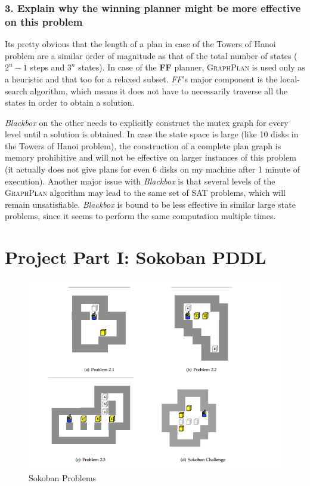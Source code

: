\documentclass[10pt, letter]{article}
\begin{document}
\subsubsection*{3. Explain why the winning planner might be more effective on this problem}
Its pretty obvious that the length of a plan in case of the Towers of Hanoi problem are a similar order of magnitude as that of the total number of states ($2^n - 1$ steps and $3^n$ states). In case of the \textbf{FF} planner, \textsc{GraphPlan} is used only as a heuristic and that too for a relaxed subset. \textit{FF}'s major component is the local-search algorithm, which means it does not have to necessarily traverse all the states in order to obtain a solution.

\textit{Blackbox} on the other needs to explicitly construct the mutex graph for every level until a solution is obtained. In case the state space is large (like 10 disks in the Towers of Hanoi problem), the construction of a complete plan graph is memory prohibitive and will not be effective on larger instances of this problem (it actually does not give plans for even 6 disks on my machine after 1 minute of execution). Another major issue with \textit{Blackbox} is that several levels of the \textsc{GraphPlan} algorithm may lead to the same set of SAT problems, which will remain unsatisfiable. \textit{Blackbox} is bound to be less effective in similar large state problems, since it seems to perform the same computation multiple times.


\section{Project Part I: Sokoban PDDL}

\begin{figure}[h]
  \centering
    \includegraphics[scale = 0.3]{images/sokoban}
    \caption{Sokoban Problems}
  \label{fig2}
\end{figure}
\end{document}
